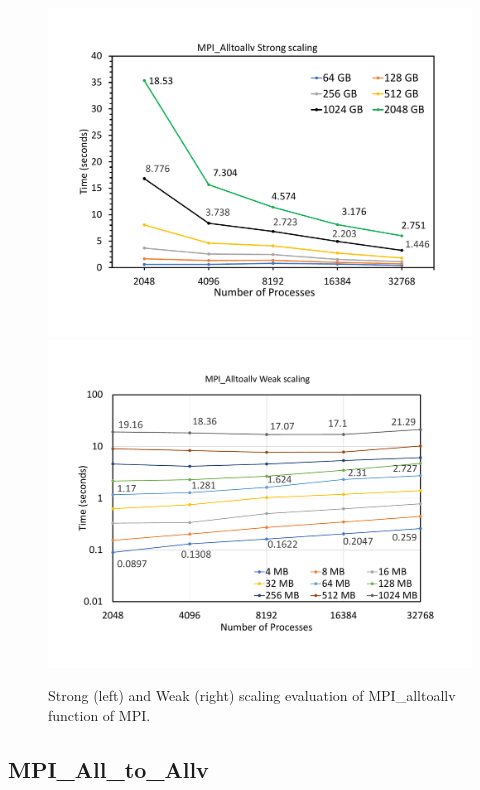 \begin{figure}[t]
	{\includegraphics[width=.50\textwidth,  trim={0cm 0cm 0cm 0cm, 
			clip}]{results/all_to_all_strong.pdf}}\hfill%
	{\includegraphics[width=.50\textwidth,  trim={0cm 0cm 0cm 0cm,
			clip}]{results/all_to_all_weak.pdf}}\hfill%
	\centering
	\caption{Strong (left) and Weak (right) scaling evaluation of MPI\_alltoallv function of MPI. }
	\label{fig:all_to_all}
\end{figure}


\subsection{MPI\_All\_to\_Allv}
\label{sec:all_to_all}


